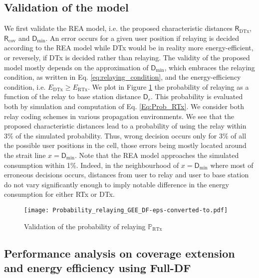\documentclass[journal]{IEEEtran}
\theoremstyle{definition}
\begin{document}
\subsection{Validation of the model}

We first validate the REA model, i.e. the proposed characteristic distances $\mathsf{R}_{\text{DTx}}$, $\mathsf{R}_{\text{cov}}$ and $\mathsf{D}_{\min}$. An error occurs for a given user position if relaying is decided according to the REA model while DTx would be in reality more energy-efficient, or reversely, if DTx is decided rather than relaying. The validity of the proposed model mostly depends on the approximation of $\mathsf{D}_{\min}$, which embraces the relaying condition, as written in Eq. \eqref{eq:relaying_condition}, and the energy-efficiency condition, i.e. $E_{\text{DTx}} \geq E_{\text{RTx}}$.
We plot in Figure \ref{fig:validity_model_prob} the probability of relaying as a function of the relay to base station distance $\mathsf{D}_r$. This probability is evaluated both by simulation and computation of Eq. \eqref{Eq:Prob_RTx}.
We consider both relay coding schemes in various propagation environments. We see that the proposed characteristic distances lead to a probability of using the relay within 3\% of the simulated probability. Thus, wrong decision occurs only for 3\% of all the possible user positions in the cell, those errors being mostly located around the strait line $x=\mathsf{D}_{\min}$.
Note that the REA model approaches the simulated consumption within 1\%. Indeed, in the neighbourhood of $x=\mathsf{D}_{\min}$ where most of erroneous decisions occurs, distances from user to relay and user to base station do not vary significantly enough to imply notable difference in the energy consumption for either RTx or DTx. 

\begin{figure}

	    \centering \hspace*{-30pt} \texttt{[image: Probability\_relaying\_GEE\_DF-eps-converted-to.pdf]}

	\caption{Validation of the probability of relaying $\mathbb{P}_{\text{RTx}}$}  
	 \label{fig:validity_model_prob}

\end{figure}


\subsection{Performance analysis on coverage extension and energy efficiency using Full-DF}
\end{document}
